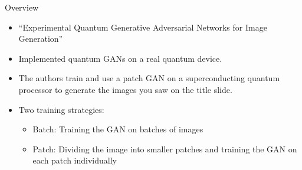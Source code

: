 
\begin{frame}{Overview}
\begin{itemize}
    \item ``Experimental Quantum Generative Adversarial Networks for Image Generation''\autocite{huang2021}
    \item Implemented quantum GANs on a real quantum device. 
    
    \item The authors train and use a patch GAN on a superconducting quantum processor to generate the images you saw on the title slide.

\item Two training strategies: \begin{itemize}
    \item Batch: Training the GAN on batches of images
    \item Patch: Dividing the image into smaller patches and training the GAN on each patch individually
\end{itemize} 
    
\end{itemize}
\end{frame}
